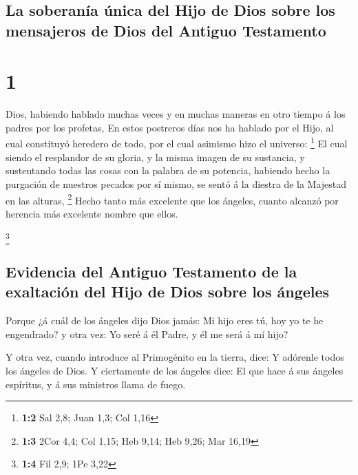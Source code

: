 \hypertarget{la-soberanuxeda-uxfanica-del-hijo-de-dios-sobre-los-mensajeros-de-dios-del-antiguo-testamento}{%
\subsection{La soberanía única del Hijo de Dios sobre los mensajeros de
Dios del Antiguo
Testamento}\label{la-soberanuxeda-uxfanica-del-hijo-de-dios-sobre-los-mensajeros-de-dios-del-antiguo-testamento}}

\hypertarget{section}{%
\section{1}\label{section}}

 Dios, habiendo hablado muchas veces y en muchas maneras
en otro tiempo á los padres por los profetas,  En estos
postreros días nos ha hablado por el Hijo, al cual constituyó heredero
de todo, por el cual asimismo hizo el universo: \footnote{\textbf{1:2}
  Sal 2,8; Juan 1,3; Col 1,16}  El cual siendo el
resplandor de su gloria, y la misma imagen de su sustancia, y
sustentando todas las cosas con la palabra de su potencia, habiendo
hecho la purgación de nuestros pecados por sí mismo, se sentó á la
diestra de la Majestad en las alturas, \footnote{\textbf{1:3} 2Cor 4,4;
  Col 1,15; Heb 9,14; Heb 9,26; Mar 16,19}  Hecho tanto
más excelente que los ángeles, cuanto alcanzó por herencia más excelente
nombre que ellos.

\footnote{\textbf{1:4} Fil 2,9; 1Pe 3,22}

\hypertarget{evidencia-del-antiguo-testamento-de-la-exaltaciuxf3n-del-hijo-de-dios-sobre-los-uxe1ngeles}{%
\subsection{Evidencia del Antiguo Testamento de la exaltación del Hijo
de Dios sobre los
ángeles}\label{evidencia-del-antiguo-testamento-de-la-exaltaciuxf3n-del-hijo-de-dios-sobre-los-uxe1ngeles}}

 Porque ¿á cuál de los ángeles dijo Dios jamás: Mi hijo
eres tú, hoy yo te he engendrado? y otra vez: Yo seré á él Padre, y él
me será á mí hijo?

 Y otra vez, cuando introduce al Primogénito en la tierra,
dice: Y adórenle todos los ángeles de Dios.  Y ciertamente
de los ángeles dice: El que hace á sus ángeles espíritus, y á sus
ministros llama de fuego.

